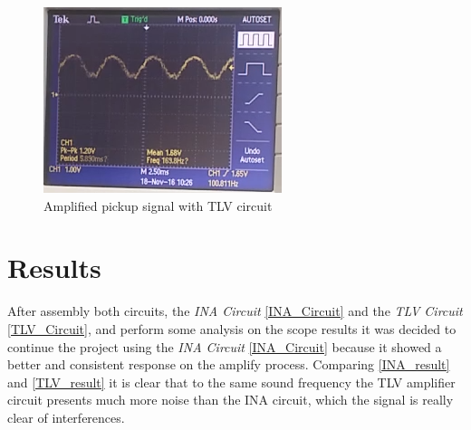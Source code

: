 \begin{figure}[!htpb]
\centering
\caption{Amplified pickup signal with TLV circuit}
\label{TLV_result}
\includegraphics[scale=1]{images/TLV_result}
\end{figure}

\section{Results}
After assembly both circuits, the \textit{INA Circuit} \autoref{INA_Circuit} and the \textit{TLV Circuit} \autoref{TLV_Circuit},
and perform some analysis on the scope results it was decided to continue the project using the \textit{INA Circuit} \autoref{INA_Circuit}
because it showed a better and consistent response on the amplify process. Comparing \autoref{INA_result} and \autoref{TLV_result}
it is clear that to the same sound frequency the TLV amplifier circuit presents much more noise than the INA circuit, which the signal is really
clear of interferences.
